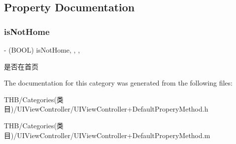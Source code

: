 \subsection{Property Documentation}
\mbox{\label{category_u_i_view_controller_07_default_propery_method_08_a556b4f407ac257deeaee4f3a45952b84}} 
\subsubsection{\texorpdfstring{is\+Not\+Home}{isNotHome}}
{\footnotesize\ttfamily -\/ (B\+O\+OL) is\+Not\+Home\hspace{0.3cm}{\ttfamily [read]}, {\ttfamily [write]}, {\ttfamily [nonatomic]}, {\ttfamily [assign]}}

是否在首页 

The documentation for this category was generated from the following files\+:\begin{DoxyCompactItemize}
\item 
T\+H\+B/\+Categories(类目)/\+U\+I\+View\+Controller/U\+I\+View\+Controller+\+Default\+Propery\+Method.\+h\item 
T\+H\+B/\+Categories(类目)/\+U\+I\+View\+Controller/U\+I\+View\+Controller+\+Default\+Propery\+Method.\+m\end{DoxyCompactItemize}
